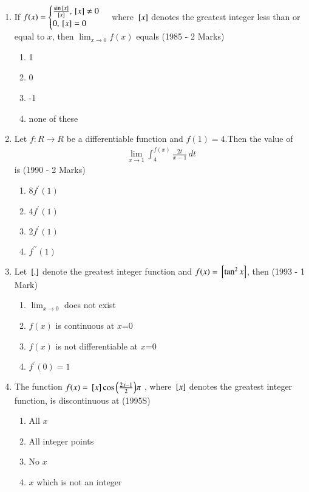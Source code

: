 \documentclass[journal,12pt,onecolumn]{IEEEtran}
\theoremstyle{remark}
\begin{document}
\begin{enumerate}
\begin{enumerate}
                 \end{enumerate}

\item If $f(x)=\begin{cases}
\frac{\sin{}\left[x\right]}{{}\left[x\right]}, {}\left[x\right]\neq 0\\ 0 ,  {}\left[x\right]=0\end{cases}$   where ${}\left[x\right]$ denotes the greatest integer less than or equal to $x$, then $\lim_{x\to 0}f(x)$ equals
    \hfill                (1985 - 2 Marks)
    \begin{enumerate}
        \item 1
        \item 0
        \item -1
        \item none of these
    \end{enumerate}

\item Let $f:R\to R$ be a differentiable function and $f(1)=4$.Then the value of
\begin{align}
 \: \lim_{x\to 1}\int_{4}^{f(x)}\frac{2t}{x-1}\,dt 
 \end{align}
 is
\hfill(1990 - 2 Marks)
 \begin{enumerate}
     \item 8$f^{\prime}(1)$
     \item $4f^{\prime}(1)$
     \item $2f^{\prime}(1)$
     \item $f^{\prime\prime}(1)$
     
     
 \end{enumerate}

\item Let ${}\left[.\right]$ denote the greatest integer function and $f(x)={}\left[\tan^2{x}\right]$, then
\hfill(1993 - 1 Mark)
    \begin{enumerate}
        \item $\lim_{x\to 0}$ does not exist
        \item $f(x)$ is continuous at $x$=0
        \item $f(x)$ is not differentiable at $x$=0
        \item $f^{\prime}(0)=1$
        
    \end{enumerate}

\item The function $f(x)={}\left[x\right]\cos{\ensuremath{\left(\frac{2x-1}{2}\right)}}\pi$ , where ${}\left[x\right]$ denotes the greatest integer function, is discontinuous at
\hfill(1995S)
   \begin{enumerate}
       \item All $x$
       \item All integer points
       \item No $x$
       \item $x$ which is not an integer
   \end{enumerate}


\end{enumerate}
\end{document}
